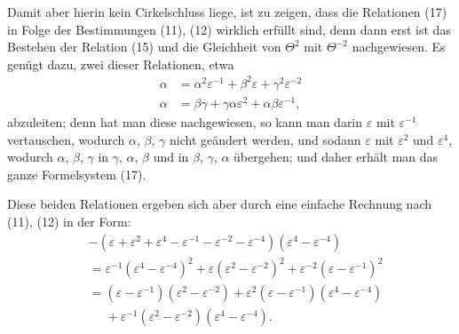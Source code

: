 Damit aber hierin kein Cirkelschluss liege, ist zu zeigen, dass die Relationen (17) in Folge der Bestimmungen (11), (12) wirklich erfüllt sind, denn dann erst ist das Bestehen der Relation (15) und die Gleichheit von $\Theta^2$ mit $\Theta^{-2}$ nachgewiesen. Es genügt dazu, zwei dieser Relationen, etwa
\[ \begin{aligned}
\alpha &= \alpha^2\varepsilon^{-1} + \beta^2\varepsilon + \gamma^2\varepsilon^{-2} \\
\alpha &= \beta\gamma + \gamma\alpha\varepsilon^2 + \alpha\beta\varepsilon^{-1},
\end{aligned} \]
abzuleiten; denn hat man diese nachgewiesen, so kann man darin $\varepsilon$ mit $\varepsilon^{-1}$ vertauschen, wodurch $\alpha$, $\beta$, $\gamma$ nicht geändert werden, und sodann $\varepsilon$ mit $\varepsilon^2$ und $\varepsilon^4$, wodurch $\alpha$, $\beta$, $\gamma$ in $\gamma$, $\alpha$, $\beta$ und in $\beta$, $\gamma$, $\alpha$ übergehen; und daher erhält man das ganze Formelsystem (17).

Diese beiden Relationen ergeben sich aber durch eine einfache Rechnung nach (11), (12) in der Form:
\[ \begin{aligned}
&-(\varepsilon + \varepsilon^2 + \varepsilon^4 - \varepsilon^{-1} - \varepsilon^{-2} - \varepsilon^{-4})(\varepsilon^4 - \varepsilon^{-4}) \\
&= \varepsilon^{-1}(\varepsilon^4 - \varepsilon^{-4})^2 + \varepsilon(\varepsilon^2 - \varepsilon^{-2})^2 + \varepsilon^{-2}(\varepsilon - \varepsilon^{-1})^2 \\
&= (\varepsilon - \varepsilon^{-1})(\varepsilon^2 - \varepsilon^{-2}) + \varepsilon^2(\varepsilon - \varepsilon^{-1})(\varepsilon^4 - \varepsilon^{-4}) \\
&\phantom{=} + \varepsilon^{-1}(\varepsilon^2 - \varepsilon^{-2})(\varepsilon^4 - \varepsilon^{-4}).
\end{aligned} \]
